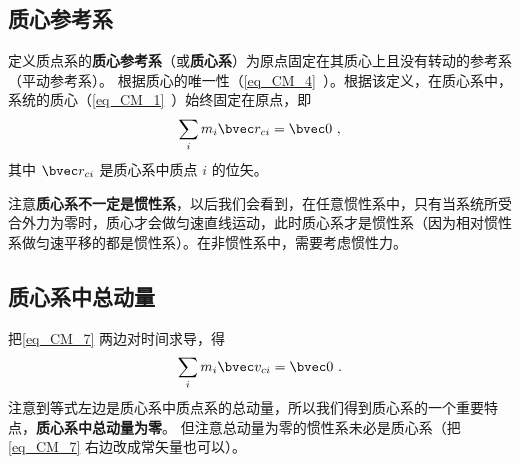 

\subsection{质心参考系}\label{sub_CM_2}
定义质点系的\textbf{质心参考系}（或\textbf{质心系}）为原点固定在其质心上且没有转动的参考系（平动参考系）。%
根据质心的唯一性（\autoref{eq_CM_4}~）。根据该定义，在质心系中，系统的质心（\autoref{eq_CM_1}~）始终固定在原点，即
\begin{equation}\label{eq_CM_7}
\sum_i m_i \bvec r_{ci} = \bvec 0~,
\end{equation}
其中 $\bvec r_{ci}$ 是质心系中质点 $i$ 的位矢。

注意\textbf{质心系不一定是惯性系}，以后我们会看到，在任意惯性系中，只有当系统所受合外力为零时，质心才会做匀速直线运动，此时质心系才是惯性系（因为相对惯性系做匀速平移的都是惯性系）。在非惯性系中，需要考虑惯性力。

\subsection{质心系中总动量}
把\autoref{eq_CM_7} 两边对时间求导，得
\begin{equation}\label{eq_CM_8}
\sum_i m_i \bvec v_{ci} = \bvec 0~.
\end{equation}
注意到等式左边是质心系中质点系的总动量，所以我们得到质心系的一个重要特点，\textbf{质心系中总动量为零}。 但注意总动量为零的惯性系未必是质心系（把\autoref{eq_CM_7} 右边改成常矢量也可以）。

